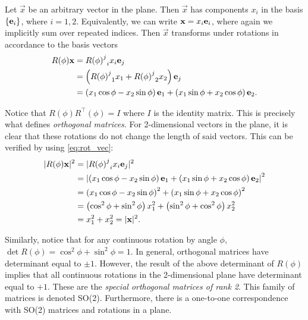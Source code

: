 Let $\vec{x}$ be an arbitrary vector in the plane. Then $\vec{x}$ has components $x_i$ in the basis $\{\mathbf{e}_i\}$, where $i=1,2$. Equivalently, we can write $\mathbf{x}=x_i\mathbf{e}_i$, where again we implicitly sum over repeated indices. Then $\vec{x}$ transforms under rotations in accordance to the basis vectors
\begin{align}
    \begin{split}        
    R(\phi)\mathbf{x} &= {{R(\phi)}^j}_i x_i \mathbf{e}_j \\
    &= \left( {{R(\phi)}^j}_1x_1 + {{R(\phi)}^j}_2x_2 \right) \mathbf{e}_j \\
    &= \left( x_1\cos\phi - x_2\sin\phi \right)\mathbf{e}_1 + \left( x_1\sin\phi + x_2\cos\phi \right)\mathbf{e}_2. \label{eq:rot_vec} 
    \end{split}
\end{align}

Notice that $R(\phi)R^\top(\phi) = I$ where $I$ is the identity matrix. This is precisely what defines \textit{orthogonal matrices}. For 2-dimensional vectors in the plane, it is clear that these rotations do not change the length of said vectors. This can be verified by using \cref{eq:rot_vec}:
\begin{align}
    \begin{split}        
    |R(\phi)\mathbf{x}|^2 &= |{{R(\phi)}^j}_i x_i\mathbf{e}_j|^2 \\
    &= \left|\left( x_1\cos\phi - x_2\sin\phi \right)\mathbf{e}_1 + \left( x_1\sin\phi + x_2\cos\phi \right)\mathbf{e}_2\right|^2 \\
    &= {\left( x_1\cos\phi - x_2\sin\phi \right)}^2 + {\left( x_1\sin\phi + x_2\cos\phi \right)}^2 \\
    &= \left( \cos^2\phi + \sin^2\phi \right)x_1^2 + \left( \sin^2\phi + \cos^2\phi \right)x_2^2 \\
    &= x_1^2 + x_2^2 = |\mathbf{x}|^2.
    \end{split}
\end{align}

Similarly, notice that for any continuous rotation by angle $\phi$, $\det R(\phi) = \cos^2\phi+\sin^2\phi = 1$. In general, orthogonal matrices have determinant equal to $\pm1$. However, the result of the above determinant of $R(\phi)$ implies that all continuous rotations in the 2-dimensional plane have determinant equal to $+1$. These are the \textit{special orthogonal matrices of rank 2}. This family of matrices is denoted SO(2). Furthermore, there is a one-to-one correspondence with SO(2) matrices and rotations in a plane.

